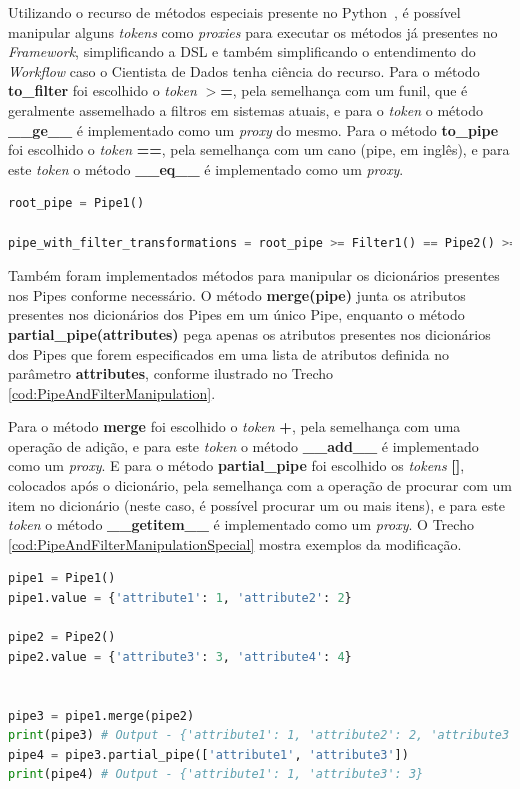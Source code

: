 \documentclass[portugues]{ic-tese}
\begin{document}
Utilizando o recurso de métodos especiais presente no Python~\citep{Pyspmethods_2022}, é possível manipular alguns \textit{tokens} como \textit{proxies} para executar os métodos já presentes no \textit{Framework}, simplificando a DSL e também simplificando o entendimento do \textit{Workflow} caso o Cientista de Dados tenha ciência do recurso. Para o método \textbf{to\_filter} foi escolhido o \textit{token} \textbf{$>$=}, pela semelhança com um funil, que é geralmente assemelhado a filtros em sistemas atuais, e para o \textit{token} o método \textbf{\_\_ge\_\_} é implementado como um \textit{proxy} do mesmo. Para o método \textbf{to\_pipe} foi escolhido o \textit{token} \textbf{==}, pela semelhança com um cano (pipe, em inglês), e para este \textit{token} o método \textbf{\_\_eq\_\_} é implementado como um \textit{proxy}.

\begin{lstlisting}[language=Python, caption=Trecho \ref{cod:PipeAndFilterMethods} adaptado com métodos especiais da linguagem \textit{Python},label=cod:PipeAndFilterSpecialMethods]
root_pipe = Pipe1()

pipe_with_filter_transformations = root_pipe >= Filter1() == Pipe2() >= Filter2() == Pipe3()
\end{lstlisting}

Também foram implementados métodos para manipular os dicionários presentes nos Pipes conforme necessário. O método \textbf{merge(pipe)} junta os atributos presentes nos dicionários dos Pipes em um único Pipe, enquanto o método \textbf{partial\_pipe(attributes)} pega apenas os atributos presentes nos dicionários dos Pipes que forem especificados em uma lista de atributos definida no parâmetro \textbf{attributes}, conforme ilustrado no Trecho \ref{cod:PipeAndFilterManipulation}.

Para o método \textbf{merge} foi escolhido o \textit{token} \textbf{+}, pela semelhança com uma operação de adição, e para este \textit{token} o método \textbf{\_\_add\_\_} é implementado como um \textit{proxy}. E para o método \textbf{partial\_pipe} foi escolhido os \textit{tokens} \textbf{[]}, colocados após o dicionário, pela semelhança com a operação de procurar com um item no dicionário (neste caso, é possível procurar um ou mais itens), e para este \textit{token} o método \textbf{\_\_getitem\_\_} é implementado como um \textit{proxy}. O Trecho \ref{cod:PipeAndFilterManipulationSpecial} mostra exemplos da modificação.

\begin{lstlisting}[language=Python, caption=Manipulações para Pipes presentes no \textit{Framework},label=cod:PipeAndFilterManipulation]
pipe1 = Pipe1()
pipe1.value = {'attribute1': 1, 'attribute2': 2}

pipe2 = Pipe2()
pipe2.value = {'attribute3': 3, 'attribute4': 4}


pipe3 = pipe1.merge(pipe2)
print(pipe3) # Output - {'attribute1': 1, 'attribute2': 2, 'attribute3': 3, 'attribute4': 4}
pipe4 = pipe3.partial_pipe(['attribute1', 'attribute3'])
print(pipe4) # Output - {'attribute1': 1, 'attribute3': 3}
\end{lstlisting}
\end{document}
